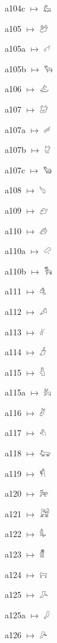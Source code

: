 {\noindent a104c $\mapsto$ {\ahfont 𔑹}\par
\noindent a105 $\mapsto$ {\ahfont 𔑺}\par
\noindent a105a $\mapsto$ {\ahfont 𔑻}\par
\noindent a105b $\mapsto$ {\ahfont 𔑼}\par
\noindent a106 $\mapsto$ {\ahfont 𔑽}\par
\noindent a107 $\mapsto$ {\ahfont 𔑾}\par
\noindent a107a $\mapsto$ {\ahfont 𔑿}\par
\noindent a107b $\mapsto$ {\ahfont 𔒀}\par
\noindent a107c $\mapsto$ {\ahfont 𔒁}\par
\noindent a108 $\mapsto$ {\ahfont 𔒂}\par
\noindent a109 $\mapsto$ {\ahfont 𔒃}\par
\noindent a110 $\mapsto$ {\ahfont 𔒄}\par
\noindent a110a $\mapsto$ {\ahfont 𔒅}\par
\noindent a110b $\mapsto$ {\ahfont 𔒆}\par
\noindent a111 $\mapsto$ {\ahfont 𔒇}\par
\noindent a112 $\mapsto$ {\ahfont 𔒈}\par
\noindent a113 $\mapsto$ {\ahfont 𔒉}\par
\noindent a114 $\mapsto$ {\ahfont 𔒊}\par
\noindent a115 $\mapsto$ {\ahfont 𔒋}\par
\noindent a115a $\mapsto$ {\ahfont 𔒌}\par
\noindent a116 $\mapsto$ {\ahfont 𔒍}\par
\noindent a117 $\mapsto$ {\ahfont 𔒎}\par
\noindent a118 $\mapsto$ {\ahfont 𔒏}\par
\noindent a119 $\mapsto$ {\ahfont 𔒐}\par
\noindent a120 $\mapsto$ {\ahfont 𔒑}\par
\noindent a121 $\mapsto$ {\ahfont 𔒒}\par
\noindent a122 $\mapsto$ {\ahfont 𔒓}\par
\noindent a123 $\mapsto$ {\ahfont 𔒔}\par
\noindent a124 $\mapsto$ {\ahfont 𔒕}\par
\noindent a125 $\mapsto$ {\ahfont 𔒖}\par
\noindent a125a $\mapsto$ {\ahfont 𔒗}\par
\noindent a126 $\mapsto$ {\ahfont 𔒘}\par
}
